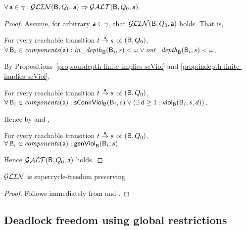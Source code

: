 \begin{lemma} \label{lemma:glob-lin-implies-globANDOR} \label{GLinGAO} \label{lem:glob-lin-implies-globANDOR} 
$\fa \act \in \gamma: \GLin(\B, Q_0, \act) \imp \GAO(\B, Q_0, \act)$.  
\end{lemma}
%
\begin{proof}
Assume, for arbitrary $\act \in \gamma$, that $\GLin(\B, Q_0, \act)$ holds. That is, 
 
\ind For every reachable transition $t \goesto[\act] s$ of $(\B, Q_0)$,\\
\ind \ind  $\fas \B_i \in \cmps{\act}: \widepth{\B}{\B_i}{s} < \omega \lor \wodepth{\B}{\B_i}{s} < \omega$.

\noindent
By Propositions~\ref{prop:outdepth-finite-implies-scViol} and \ref{prop:indepth-finite-implies-scViol},

\ind For every reachable transition $t \goesto[\act] s$ of $(\B, Q_0)$,\\
\ind \ind  $\fas \B_i \in \cmps{\act}:  \connViol{\B_i}{s} \lor (\ex d \ge 1: \viol{\B_i}{d}{s})$.

\noindent
Hence by  and ,

\ind For every reachable transition $t \goesto[\act] s$ of $(\B, Q_0)$,\\
\ind \ind  $\fas \B_i \in \cmps{\act} : \formViol{\B_i}{s}$

\noindent
Hence $\GAO(\B, Q_0, \act)$ holds.
\end{proof}


\begin{theorem} \label{thm:GLin.SC-free-preserving}
$\GLin$ is supercycle-freedom preserving
\end{theorem}
%
\begin{proof}
Follows immediately from  and .
\end{proof}





\subsection{Deadlock freedom using global restrictions}



